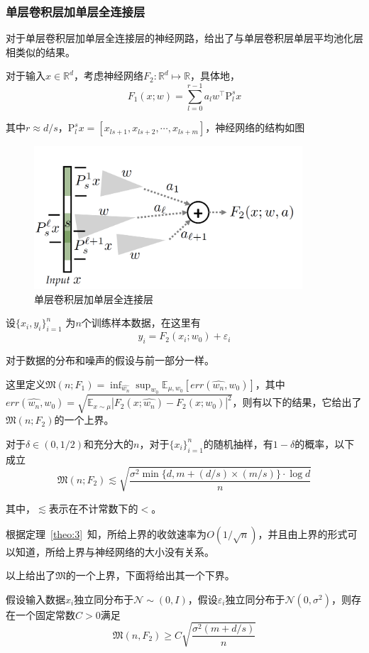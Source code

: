 \subsubsection{单层卷积层加单层全连接层}
对于单层卷积层加单层全连接层的神经网路，\citet{du2018many}给出了与单层卷积层单层平均池化层相类似的结果。
\par
对于输入$x\in \mathbb{R}^d$，考虑神经网络$F_2: \mathbb{R}^d \mapsto \mathbb{R}$，具体地，
\[
  F_1(x;w) = \sum_{l=0}^{r-1}a_l w^{\top} \mathrm{P}_l^s x
\]
\par
其中$r\approx d/s$，$\mathrm{P}_l^s x=[x_{ls+1},x_{ls+2},\cdots,x_{ls+m}]$，神经网络的结构如图
\begin{figure}
\centering
\includegraphics[width=10cm]{./figures/convf.PNG}
\caption{单层卷积层加单层全连接层}
\label{fig:convf}
\end{figure}
\par
设$\{x_i,y_i\}_{i=1}^n$ 为$n$个训练样本数据，在这里有
\[
  y_i = F_2(x_i;w_0)+\varepsilon_i
\]
\par
对于数据的分布和噪声的假设与前一部分一样。
\par
这里定义$\mathfrak{M}(n;F_1) = \inf_{\hat{w_n}}\sup_{w_0}\mathbb{E}_{\mu,w_0}[err(\hat{w_n},w_0)]$，其中$err(\hat{w_n},w_0) = \sqrt{\mathbb{E}_{x\sim\mu}|F_2(x;\hat{w_n})- F_2(x;w_0)|^2}$，则有以下的结果，它给出了$\mathfrak{M}(n;F_2)$的一个上界。
\begin{theorem}\label{theo:3}
对于$\delta\in (0,1/2)$和充分大的$n$，对于$\{x_i\}_{i=1}^n$的随机抽样，有$1-\delta$的概率，以下成立
\[
	\mathfrak{M}(n;F_2) \lesssim \sqrt{\frac{\sigma^2 \min\{d,m+(d/s)\times (m/s)\}\cdot \log d}{n}}
\]
\par
其中，$\lesssim$表示在不计常数下的$<$。
\end{theorem}


\par
根据定理~\ref{theo:3}~知，所给上界的收敛速率为$O(1/\sqrt{n})$，并且由上界的形式可以知道，所给上界与神经网络的大小没有关系。
\par
以上给出了$\mathfrak{M}$的一个上界，下面将给出其一个下界。
\begin{theorem}\label{theo:4}
假设输入数据$x_i$独立同分布于$\mathcal{N}\sim (0,I)$，假设$\varepsilon_i$独立同分布于$\mathcal{N}(0,\sigma^2)$，则存在一个固定常数$C > 0$满足
\begin{equation}
\mathfrak{M}(n,F_2) \geq C\sqrt{\frac{\sigma^2 (m+d/s)}{n}}
\end{equation}
\end{theorem}



